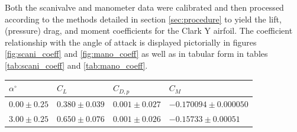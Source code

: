 \documentclass[runningheads]{llncs}
\begin{document}
\noindent
Both the scanivalve and manometer data were calibrated and then processed according to the methods detailed in section \ref{sec:procedure} to yield the lift, (pressure) drag, and  moment coefficients for the Clark Y airfoil. The coefficient relationship with the angle of attack is displayed pictorially in figures \ref{fig:scani_coeff} and \ref{fig:mano_coeff} as well as in tabular form in tables \ref{tab:scani_coeff} and \ref{tab:mano_coeff}.\newline

\begin{table}[h]
\centering
\begin{tabular}{p{3cm}p{3cm}p{3cm}p{3cm}}
\toprule
$\alpha^\circ$ &                   $C_L$ &               $C_{D,p}$ &                    $C_M$ \\
\midrule
 $0.00\pm0.25$ & $0.380\pm0.039$ & $0.001\pm0.027$ &  $-0.170094\pm0.000050$ \\
 $3.00\pm0.25$ & $0.650\pm0.076$ & $0.001\pm0.026$ & $-0.15733\pm0.00051$ \\

\end{tabular}
\end{table}
\end{document}
